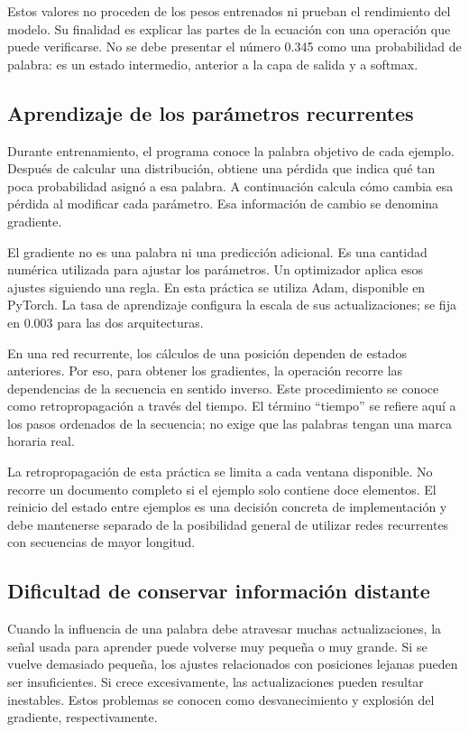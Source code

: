 Estos valores no proceden de los pesos entrenados ni prueban el rendimiento del modelo. Su finalidad es explicar las partes de la ecuación con una operación que puede verificarse. No se debe presentar el número 0.345 como una probabilidad de palabra: es un estado intermedio, anterior a la capa de salida y a softmax.

\subsection{Aprendizaje de los parámetros recurrentes}
Durante entrenamiento, el programa conoce la palabra objetivo de cada ejemplo. Después de calcular una distribución, obtiene una pérdida que indica qué tan poca probabilidad asignó a esa palabra. A continuación calcula cómo cambia esa pérdida al modificar cada parámetro. Esa información de cambio se denomina gradiente.

El gradiente no es una palabra ni una predicción adicional. Es una cantidad numérica utilizada para ajustar los parámetros. Un optimizador aplica esos ajustes siguiendo una regla. En esta práctica se utiliza Adam, disponible en PyTorch. La tasa de aprendizaje configura la escala de sus actualizaciones; se fija en 0.003 para las dos arquitecturas.

En una red recurrente, los cálculos de una posición dependen de estados anteriores. Por eso, para obtener los gradientes, la operación recorre las dependencias de la secuencia en sentido inverso. Este procedimiento se conoce como retropropagación a través del tiempo. El término ``tiempo'' se refiere aquí a los pasos ordenados de la secuencia; no exige que las palabras tengan una marca horaria real.

La retropropagación de esta práctica se limita a cada ventana disponible. No recorre un documento completo si el ejemplo solo contiene doce elementos. El reinicio del estado entre ejemplos es una decisión concreta de implementación y debe mantenerse separado de la posibilidad general de utilizar redes recurrentes con secuencias de mayor longitud.

\subsection{Dificultad de conservar información distante}
Cuando la influencia de una palabra debe atravesar muchas actualizaciones, la señal usada para aprender puede volverse muy pequeña o muy grande. Si se vuelve demasiado pequeña, los ajustes relacionados con posiciones lejanas pueden ser insuficientes. Si crece excesivamente, las actualizaciones pueden resultar inestables. Estos problemas se conocen como desvanecimiento y explosión del gradiente, respectivamente.

